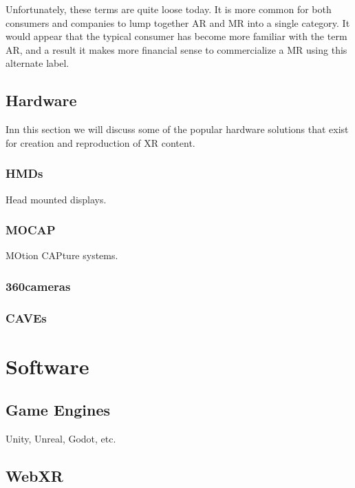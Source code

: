 Unfortunately, these terms are quite loose today. It is more common for both consumers and companies to lump together AR and MR into a single category. It would appear that the typical consumer has become more familiar with the term AR, and a result it makes more financial sense to commercialize a MR using this alternate label. 

\subsection{Hardware}
Inn this section we will discuss some of the popular hardware solutions that exist for creation and reproduction of XR content. 

\subsubsection{HMDs}
Head mounted displays.

\subsubsection{MOCAP}
MOtion CAPture systems. 

\subsubsection{360\textdegree cameras}

\subsubsection{CAVEs}

\section{Software}
\subsection{Game Engines}
Unity, Unreal, Godot, etc.

\subsection{WebXR}

